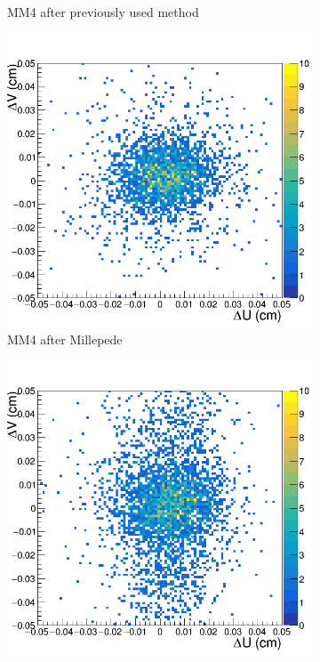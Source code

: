 \begin{figure}[h!]
\begin{subfigure}[l]{.45\textwidth}
   \caption{MM4 after previously used method}
   \label{fig:MX4_after_prev}
 \end{subfigure}
 \begin{subfigure}[r]{.45\textwidth}
   \centering
   \includegraphics[width=\linewidth]{thesis_figures/alignment/Run_3211_after_millepede/square/MX4.png}
   \caption{MM4 after Millepede}
 \end{subfigure}
 \hfill
 \begin{subfigure}[l]{.45\textwidth}
   \centering
   \includegraphics[width=\linewidth]{thesis_figures/alignment/Run_3211_after_prev/square/MX5.png}

\end{subfigure}
\end{figure}
